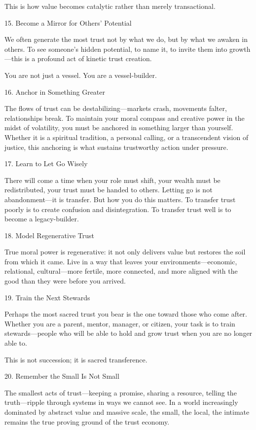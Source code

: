 \documentclass[11pt,oneside]{book}
\begin{document}
This is how value becomes catalytic rather than merely transactional.

15. Become a Mirror for Others’ Potential


We often generate the most trust not by what we do, but by what we awaken in others. To see someone’s hidden potential, to name it, to invite them into growth—this is a profound act of kinetic trust creation.

You are not just a vessel. You are a vessel-builder.

16. Anchor in Something Greater


The flows of trust can be destabilizing—markets crash, movements falter, relationships break. To maintain your moral compass and creative power in the midst of volatility, you must be anchored in something larger than yourself. Whether it is a spiritual tradition, a personal calling, or a transcendent vision of justice, this anchoring is what sustains trustworthy action under pressure.

17. Learn to Let Go Wisely


There will come a time when your role must shift, your wealth must be redistributed, your trust must be handed to others. Letting go is not abandonment—it is transfer. But how you do this matters. To transfer trust poorly is to create confusion and disintegration. To transfer trust well is to become a legacy-builder.

18. Model Regenerative Trust


True moral power is regenerative: it not only delivers value but restores the soil from which it came. Live in a way that leaves your environments—economic, relational, cultural—more fertile, more connected, and more aligned with the good than they were before you arrived.

19. Train the Next Stewards


Perhaps the most sacred trust you bear is the one toward those who come after. Whether you are a parent, mentor, manager, or citizen, your task is to train stewards—people who will be able to hold and grow trust when you are no longer able to.

This is not succession; it is sacred transference.

20. Remember the Small Is Not Small


The smallest acts of trust—keeping a promise, sharing a resource, telling the truth—ripple through systems in ways we cannot see. In a world increasingly dominated by abstract value and massive scale, the small, the local, the intimate remains the true proving ground of the trust economy.
\end{document}
